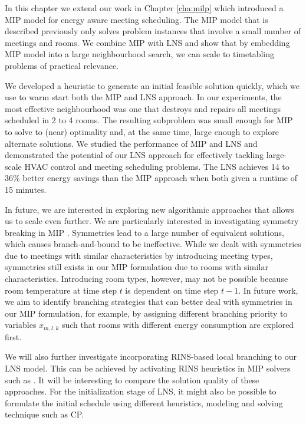 In this chapter we extend our work in Chapter \ref{cha:milp} which introduced a MIP model for energy aware meeting scheduling. The MIP model that is described previously only solves problem instances that involve a small number of meetings and rooms. We combine MIP with LNS %
and show that by embedding MIP model into a large neighbourhood search, we can scale to timetabling problems of practical relevance.

We developed a heuristic to generate an initial feasible solution quickly, which we use to warm start both the MIP and LNS approach. In our experiments, the most effective neighbourhood was one that destroys and repairs all meetings scheduled in 2 to 4 rooms. The resulting subproblem was small enough for MIP to solve to (near) optimality and, at the same time, large enough to explore alternate solutions. We studied the performance of MIP and LNS and demonstrated the potential of our LNS approach for effectively tackling large-scale HVAC control and meeting scheduling problems. The LNS achieves 14 to 36\% better energy savings than the MIP approach when both given a runtime of 15 minutes. 

In future, we are interested in exploring new algorithmic approaches that allows us to scale even further. We are particularly interested in investigating symmetry breaking in MIP \citep{ostrowski2015modified}. Symmetries lead to a large number of equivalent solutions, which causes branch-and-bound to be ineffective. While we dealt with symmetries due to meetings with similar characteristics by introducing meeting types, symmetries still exists in our MIP formulation due to rooms with similar characteristics. Introducing room types, however, may not be possible because room temperature at time step $t$ is dependent on time step $t-1$. In future work, we aim to identify branching strategies that can better deal with symmetries in our MIP formulation, for example, by assigning different branching priority to variables $x_{m,l,k}$ such that rooms with different energy consumption are explored first. %

We will also further investigate incorporating RINS-based local branching to our LNS model. This can be achieved by activating RINS  heuristics in MIP solvers such as \cite{gurobi}. It will be interesting to compare the solution quality of these approaches.
For the initialization stage of LNS, it might also be possible to formulate the initial schedule using different heuristics, modeling and solving technique such as CP. 



